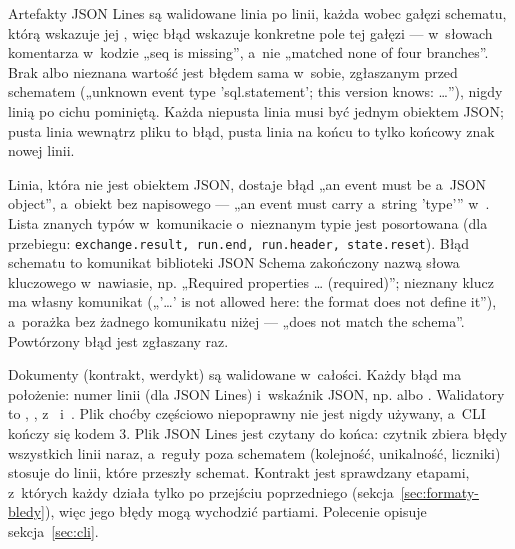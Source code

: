 Artefakty JSON Lines są walidowane linia po linii, każda wobec gałęzi schematu, którą wskazuje
jej , więc błąd wskazuje konkretne pole tej gałęzi --- w~słowach komentarza w~kodzie
„seq is missing”, a~nie „matched none of four branches”. Brak albo nieznana wartość  jest błędem sama w~sobie, zgłaszanym przed
schematem („unknown event type 'sql.statement'; this version knows: …”), nigdy linią po
cichu pominiętą. Każda niepusta linia musi być jednym obiektem JSON; pusta linia wewnątrz pliku
to błąd, pusta linia na końcu to tylko końcowy znak nowej linii.

Linia, która nie jest obiektem JSON, dostaje błąd „an event must be a~JSON object”, a~obiekt
bez napisowego  --- „an event must carry a~string 'type'” w~.
Lista znanych typów w~komunikacie o~nieznanym typie jest posortowana (dla przebiegu:
\texttt{exchange.result, run.end, run.header, state.reset}). Błąd schematu to komunikat
biblioteki JSON Schema zakończony nazwą słowa kluczowego w~nawiasie, np. „Required properties
… (required)”; nieznany klucz ma własny komunikat („'…' is not allowed here: the format does
not define it”), a~porażka bez żadnego komunikatu niżej --- „does not match the schema”.
Powtórzony błąd jest zgłaszany raz.

Dokumenty (kontrakt, werdykt) są walidowane w~całości. Każdy błąd ma położenie: numer linii
(dla JSON Lines) i~wskaźnik JSON, np.  albo
. Walidatory to ,
,  z~ i~. Plik choćby częściowo niepoprawny nie jest nigdy używany, a~CLI kończy
się kodem 3. Plik JSON Lines jest czytany do końca: czytnik zbiera błędy wszystkich linii
naraz, a~reguły poza schematem (kolejność, unikalność, liczniki) stosuje do linii, które
przeszły schemat. Kontrakt jest sprawdzany etapami, z~których każdy działa tylko po
przejściu poprzedniego (sekcja~\ref{sec:formaty-bledy}), więc jego błędy mogą wychodzić
partiami. Polecenie  opisuje sekcja~\ref{sec:cli}.


